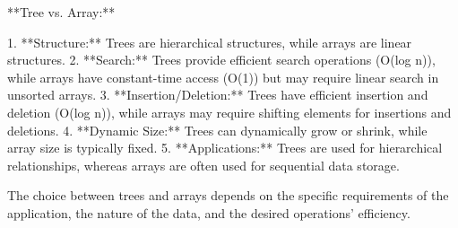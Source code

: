 **Tree vs. Array:**

1. **Structure:** Trees are hierarchical structures, while arrays are linear structures.
2. **Search:** Trees provide efficient search operations (O(log n)), while arrays have constant-time access (O(1)) but may require linear search in unsorted arrays.
3. **Insertion/Deletion:** Trees have efficient insertion and deletion (O(log n)), while arrays may require shifting elements for insertions and deletions.
4. **Dynamic Size:** Trees can dynamically grow or shrink, while array size is typically fixed.
5. **Applications:** Trees are used for hierarchical relationships, whereas arrays are often used for sequential data storage.

The choice between trees and arrays depends on the specific requirements of the application, the nature of the data, and the desired operations' efficiency.